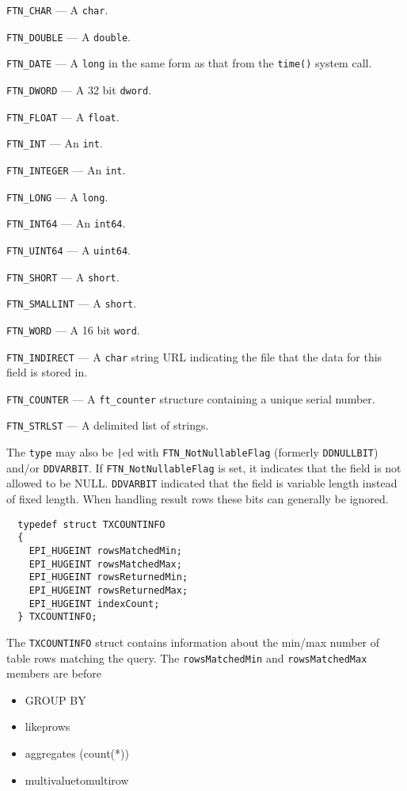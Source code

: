 \verb`FTN_CHAR` --- A \verb`char`.

\verb`FTN_DOUBLE` --- A \verb`double`.

\verb`FTN_DATE` --- A \verb`long` in the same form as that from the
\verb`time()` system call.

\verb`FTN_DWORD` --- A 32 bit \verb`dword`.

\verb`FTN_FLOAT` --- A \verb`float`.

\verb`FTN_INT` --- An \verb`int`.

\verb`FTN_INTEGER` --- An \verb`int`.

\verb`FTN_LONG` --- A \verb`long`.

\verb`FTN_INT64` --- An \verb`int64`.

\verb`FTN_UINT64` --- A \verb`uint64`.

\verb`FTN_SHORT` --- A \verb`short`.

\verb`FTN_SMALLINT` --- A \verb`short`.

\verb`FTN_WORD` --- A 16 bit \verb`word`.

\verb`FTN_INDIRECT` --- A \verb`char` string URL indicating the file that
the data for this field is stored in.

\verb`FTN_COUNTER` --- A \verb`ft_counter` structure containing a unique serial
number.

\verb`FTN_STRLST` --- A delimited list of strings.

The \verb`type` may also be \verb`|`ed with \verb`FTN_NotNullableFlag`
(formerly \verb`DDNULLBIT`) and/or \verb`DDVARBIT`.
If \verb`FTN_NotNullableFlag` is set, it indicates that the field is not
allowed to be NULL. \verb`DDVARBIT` indicated that the field is
variable length instead of fixed length. When handling result rows
these bits can generally be ignored.



\SYNOPSIS
\begin{verbatim}
  typedef struct TXCOUNTINFO
  {
    EPI_HUGEINT	rowsMatchedMin;
    EPI_HUGEINT	rowsMatchedMax;
    EPI_HUGEINT	rowsReturnedMin;
    EPI_HUGEINT	rowsReturnedMax;
    EPI_HUGEINT	indexCount;
  } TXCOUNTINFO;
\end{verbatim}

\DESCRIPTION
The \verb`TXCOUNTINFO` struct contains information about the min/max
number of table rows matching the query.
%
The \verb`rowsMatchedMin`
and \verb`rowsMatchedMax` members are before
\begin{itemize}
  \item GROUP BY
  \item likeprows
  \item aggregates (count(*))
  \item multivaluetomultirow
\end{itemize}

